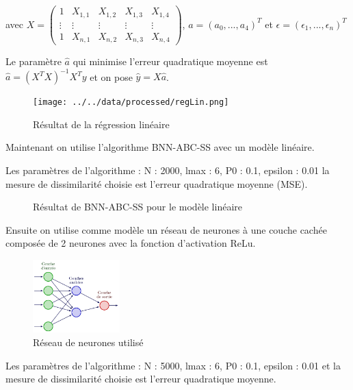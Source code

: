\documentclass[french,12pt]{article}
\begin{document}
avec $X = \begin{pmatrix} 1      & X_{1, 1} & X_{1, 2} & X_{1, 3} & X_{1, 4} \\
                \vdots & \vdots   & \vdots   & \vdots   & \vdots   \\
                1      & X_{n, 1} & X_{n, 2} & X_{n, 3} & X_{n, 4}
    \end{pmatrix} $, $a = (a_0,..., a_4)^T$ et $\epsilon = (\epsilon_1,..., \epsilon_n)^T$

Le paramètre $\hat{a}$ qui minimise l'erreur quadratique moyenne est $\hat{a} = (X^T X)^{-1} X^T y$
et on pose $\hat{y} = X \hat{a}$.

\begin{figure}[H]
    \centering
    \texttt{[image: ../../data/processed/regLin.png]}
    \caption{Résultat de la régression linéaire}
\end{figure}

Maintenant on utilise l'algorithme BNN-ABC-SS avec un modèle linéaire.

Les paramètres de l'algorithme :
N : 2000,
lmax : 6,
P0 : 0.1,
epsilon : 0.01
la mesure de dissimilarité choisie est l'erreur quadratique moyenne (MSE).

\begin{figure}[H]
    \centering
    \caption{Résultat de BNN-ABC-SS pour le modèle linéaire}
\end{figure}

Ensuite on utilise comme modèle un réseau de neurones à une couche cachée composée de 2 neurones
avec la fonction d'activation ReLu.

\begin{figure}[H]
    \centering
    \includegraphics[width = 0.3\textwidth]{FNN/Images/fnnTemp.jpg}
    \caption[short]{Réseau de neurones utilisé}
\end{figure}

Les paramètres de l'algorithme :
N : 5000,
lmax : 6,
P0 : 0.1,
epsilon : 0.01 et
la mesure de dissimilarité choisie est l'erreur quadratique moyenne.
\end{document}
